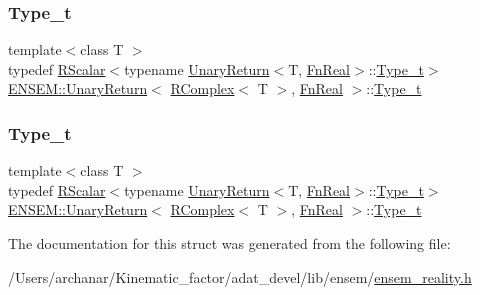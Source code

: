 \subsubsection{\texorpdfstring{Type\_t}{Type\_t}\hspace{0.1cm}{\footnotesize\ttfamily [1/2]}}
{\footnotesize\ttfamily template$<$class T $>$ \\
typedef \mbox{\hyperlink{classENSEM_1_1RScalar}{R\+Scalar}}$<$typename \mbox{\hyperlink{structENSEM_1_1UnaryReturn}{Unary\+Return}}$<$T, \mbox{\hyperlink{structENSEM_1_1FnReal}{Fn\+Real}}$>$\+::\mbox{\hyperlink{structENSEM_1_1UnaryReturn_3_01RComplex_3_01T_01_4_00_01FnReal_01_4_a2495b3d7e3cfcf3f84d7bbf892bbfd3c}{Type\+\_\+t}}$>$ \mbox{\hyperlink{structENSEM_1_1UnaryReturn}{E\+N\+S\+E\+M\+::\+Unary\+Return}}$<$ \mbox{\hyperlink{classENSEM_1_1RComplex}{R\+Complex}}$<$ T $>$, \mbox{\hyperlink{structENSEM_1_1FnReal}{Fn\+Real}} $>$\+::\mbox{\hyperlink{structENSEM_1_1UnaryReturn_3_01RComplex_3_01T_01_4_00_01FnReal_01_4_a2495b3d7e3cfcf3f84d7bbf892bbfd3c}{Type\+\_\+t}}}

\mbox{\label{structENSEM_1_1UnaryReturn_3_01RComplex_3_01T_01_4_00_01FnReal_01_4_a2495b3d7e3cfcf3f84d7bbf892bbfd3c}} 
\subsubsection{\texorpdfstring{Type\_t}{Type\_t}\hspace{0.1cm}{\footnotesize\ttfamily [2/2]}}
{\footnotesize\ttfamily template$<$class T $>$ \\
typedef \mbox{\hyperlink{classENSEM_1_1RScalar}{R\+Scalar}}$<$typename \mbox{\hyperlink{structENSEM_1_1UnaryReturn}{Unary\+Return}}$<$T, \mbox{\hyperlink{structENSEM_1_1FnReal}{Fn\+Real}}$>$\+::\mbox{\hyperlink{structENSEM_1_1UnaryReturn_3_01RComplex_3_01T_01_4_00_01FnReal_01_4_a2495b3d7e3cfcf3f84d7bbf892bbfd3c}{Type\+\_\+t}}$>$ \mbox{\hyperlink{structENSEM_1_1UnaryReturn}{E\+N\+S\+E\+M\+::\+Unary\+Return}}$<$ \mbox{\hyperlink{classENSEM_1_1RComplex}{R\+Complex}}$<$ T $>$, \mbox{\hyperlink{structENSEM_1_1FnReal}{Fn\+Real}} $>$\+::\mbox{\hyperlink{structENSEM_1_1UnaryReturn_3_01RComplex_3_01T_01_4_00_01FnReal_01_4_a2495b3d7e3cfcf3f84d7bbf892bbfd3c}{Type\+\_\+t}}}



The documentation for this struct was generated from the following file\+:\begin{DoxyCompactItemize}
\item 
/\+Users/archanar/\+Kinematic\+\_\+factor/adat\+\_\+devel/lib/ensem/\mbox{\hyperlink{lib_2ensem_2ensem__reality_8h}{ensem\+\_\+reality.\+h}}\end{DoxyCompactItemize}
